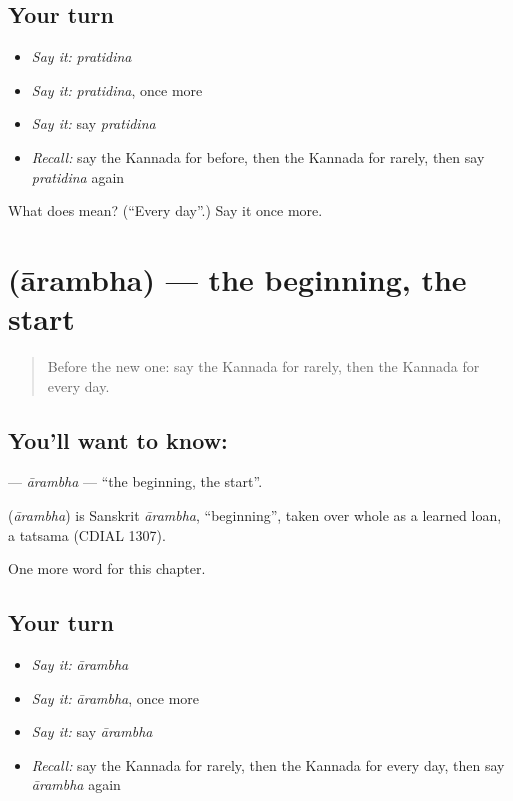 \subsection*{Your turn}
\begin{itemize}
\raggedright
  \item \emph{Say it:} \emph{pratidina}
  \item \emph{Say it:} \emph{pratidina}, once more
  \item \emph{Say it:} say \emph{pratidina}
  \item \emph{Recall:} say the Kannada for before, then the Kannada for rarely, then say \emph{pratidina} again
\end{itemize}

\begin{tcolorbox}[breakable,colback=teal!4,colframe=teal!35!black,title={Before you move on}]
What does  mean? (\textquotedblleft{}Every day\textquotedblright{}.) Say it once more.
\end{tcolorbox}
\section[\texorpdfstring{\kn{ಆರಂಭ} (ārambha)}{ಆರಂಭ (ārambha)}]{ (ārambha) — the beginning, the start}

\label{lesson:KA-C172-arambha}



\begin{quote}
Before the new one: say the Kannada for rarely, then the Kannada for every day.
\end{quote}

\subsection*{You'll want to know: }
\textbf{} — \emph{ārambha} — \textquotedblleft{}the beginning, the start\textquotedblright{}.

\begin{cousinweb}
\textbf{} (\emph{ārambha}) is Sanskrit \emph{ārambha}, \textquotedblleft{}beginning\textquotedblright{}, taken over whole as a learned loan, a tatsama (CDIAL 1307).
\end{cousinweb}

\begin{grammarlens}[title={What you've built}]
One more word for this chapter.
\end{grammarlens}

\subsection*{Your turn}
\begin{itemize}
\raggedright
  \item \emph{Say it:} \emph{ārambha}
  \item \emph{Say it:} \emph{ārambha}, once more
  \item \emph{Say it:} say \emph{ārambha}
  \item \emph{Recall:} say the Kannada for rarely, then the Kannada for every day, then say \emph{ārambha} again
\end{itemize}

